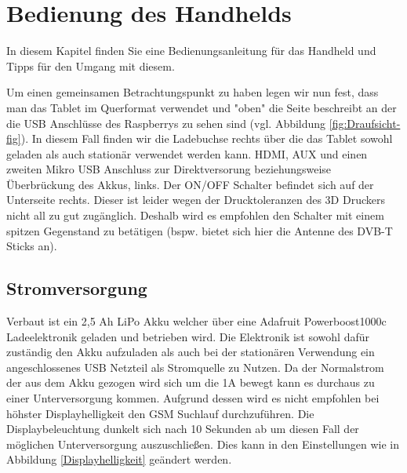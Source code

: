 %
%

\chapter{Bedienung des Handhelds}
In diesem Kapitel finden Sie eine Bedienungsanleitung für das Handheld und Tipps für den Umgang mit diesem.

Um einen gemeinsamen Betrachtungspunkt zu haben legen wir nun fest, dass man das Tablet im Querformat verwendet und "oben" die Seite beschreibt an der die USB Anschlüsse des Raspberrys zu sehen sind (vgl. Abbildung \ref{fig:Draufsicht-fig}). In diesem Fall finden wir die Ladebuchse rechts über die das Tablet sowohl geladen als auch stationär verwendet werden kann. HDMI, AUX und einen zweiten Mikro USB Anschluss zur Direktversorung beziehungsweise Überbrückung des Akkus, links. Der ON/OFF Schalter befindet sich auf der Unterseite rechts. Dieser ist leider wegen der Drucktoleranzen des 3D Druckers nicht all zu gut zugänglich. Deshalb wird es empfohlen den Schalter mit einem spitzen Gegenstand zu betätigen (bspw. bietet sich hier die Antenne des DVB-T Sticks an).

\newpage

\section{Stromversorgung}

Verbaut ist ein 2,5 Ah LiPo Akku welcher über eine Adafruit Powerboost1000c Ladeelektronik geladen und betrieben wird. Die Elektronik ist sowohl dafür zuständig den Akku aufzuladen als auch bei der stationären Verwendung ein angeschlossenes USB Netzteil als Stromquelle zu Nutzen. Da der Normalstrom der aus dem Akku gezogen wird sich um die 1A bewegt kann es durchaus zu einer Unterversorgung kommen. Aufgrund dessen wird es nicht empfohlen bei höhster Displayhelligkeit den \ac{GSM} Suchlauf durchzuführen. Die Displaybeleuchtung dunkelt sich nach 10 Sekunden ab um diesen Fall der möglichen Unterversorgung auszuschließen. Dies kann in den Einstellungen wie in Abbildung \ref{Displayhelligkeit} geändert werden. 


